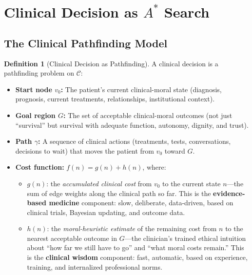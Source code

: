 \documentclass[12pt]{article}
\theoremstyle{definition}
\newtheorem{definition}[theorem]{Definition}
\theoremstyle{remark}
\newcommand{\C}{\mathcal{C}}               %
\begin{document}
\section{Clinical Decision as $A^*$ Search}
\label{sec:search}

\subsection{The Clinical Pathfinding Model}

\begin{definition}[Clinical Decision as Pathfinding]
\label{def:clinical_pathfinding}
A clinical decision is a pathfinding problem on $\C$:
\begin{itemize}
    \item \textbf{Start node $v_0$:} The patient's current clinical-moral state (diagnosis, prognosis, current treatments, relationships, institutional context).
    \item \textbf{Goal region $G$:} The set of acceptable clinical-moral outcomes (not just ``survival'' but survival with adequate function, autonomy, dignity, and trust).
    \item \textbf{Path $\gamma$:} A sequence of clinical actions (treatments, tests, conversations, decisions to wait) that moves the patient from $v_0$ toward $G$.
    \item \textbf{Cost function:} $f(n) = g(n) + h(n)$, where:
    \begin{itemize}
        \item $g(n)$: the \emph{accumulated clinical cost} from $v_0$ to the current state $n$---the sum of edge weights along the clinical path so far.  This is the \textbf{evidence-based medicine} component: slow, deliberate, data-driven, based on clinical trials, Bayesian updating, and outcome data.
        \item $h(n)$: the \emph{moral-heuristic estimate} of the remaining cost from $n$ to the nearest acceptable outcome in $G$---the clinician's trained ethical intuition about ``how far we still have to go'' and ``what moral costs remain.''  This is the \textbf{clinical wisdom} component: fast, automatic, based on experience, training, and internalized professional norms.
    \end{itemize}
\end{itemize}
\end{definition}
\end{document}
